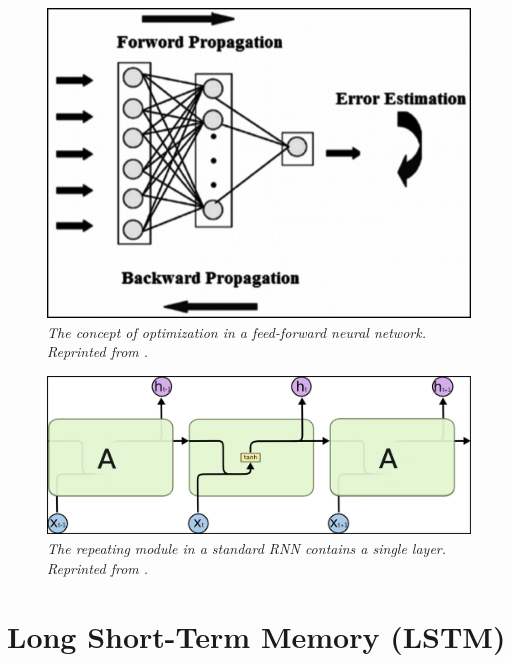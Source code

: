 \begin{figure}[H]
  \centering
  \caption[The concept of optimization in a feed-forward neural network.]{\emph{The concept of optimization in a feed-forward neural network. \\Reprinted from \citeauthor{donges_2019}. \citeyear{donges_2019}}}\label{fig:bpp}
  \includegraphics[scale = 0.4]{figures/bpp.jpg}
\end{figure}

\begin{figure}[H]
  \centering
  \caption[The repeating module in a standard RNN contains a single layer.]{\emph{The repeating module in a standard RNN contains a single layer. \\Reprinted from \citeauthor{olah_2015} \citeyear{olah_2015}.}}\label{fig:RNN_2}
  \includegraphics[scale = 0.2]{figures/RNN_2.jpg}
\end{figure}

\section{Long Short-Term Memory (LSTM)}

